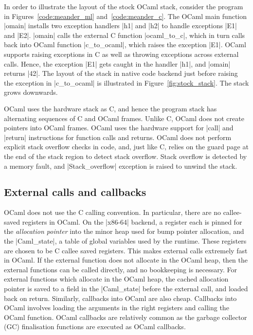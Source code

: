 \documentclass[sigplan,10pt,review,anonymous]{acmart}\settopmatter{printfolios=true,printccs=false,printacmref=false}
\begin{document}
In order to illustrate the layout of the stock OCaml stack, consider the
program in Figures~\ref{code:meander_ml} and~\ref{code:meander_c}. The OCaml
main function |omain| installs two exception handlers |h1| and |h2| to handle
exceptions |E1| and |E2|. |omain| calls the external C function |ocaml_to_c|,
which in turn calls back into OCaml function |c_to_ocaml|, which raises the
exception |E1|. OCaml supports raising exceptions in C as well as throwing
exceptions across external calls. Hence, the exception |E1| gets caught in the
handler |h1|, and |omain| returns |42|. The layout of the stack in native code
backend just before raising the exception in |c_to_ocaml| is illustrated in
Figure~\ref{fig:stock_stack}. The stack grows downwards.

OCaml uses the hardware stack as C, and hence the program stack has alternating
sequences of C and OCaml frames. Unlike C, OCaml does not create pointers into
OCaml frames. OCaml uses the hardware support for |call| and |return|
instructions for function calls and returns. OCaml does not perform explicit
stack overflow checks in code, and, just like C, relies on the guard page at
the end of the stack region to detect stack overflow. Stack overflow is
detected by a memory fault, and |Stack_overflow| exception is raised to unwind
the stack.

\subsection{External calls and callbacks}

OCaml does not use the C calling convention. In particular, there are no
callee-saved registers in OCaml. On the |x86-64| backend, a register each is
pinned for the \emph{allocation pointer} into the minor heap used for bump
pointer allocation, and the |Caml_state|, a table of global variables used by
the runtime. These registers are chosen to be C callee saved registers. This
makes external calls extremely fast in OCaml. If the external function does not
allocate in the OCaml heap, then the external functions can be called directly,
and no bookkeeping is necessary. For external functions which allocate in the
OCaml heap, the cached allocation pointer is saved to a field in the
|Caml_state| before the external call, and loaded back on return. Similarly,
callbacks into OCaml are also cheap. Callbacks into OCaml involves loading the
arguments in the right registers and calling the OCaml function. OCaml
callbacks are relatively common as the garbage collector (GC) finalisation
functions are executed as OCaml callbacks.
\end{document}
